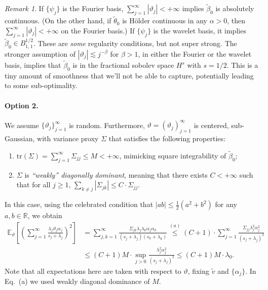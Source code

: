\documentclass[11pt,a4paper]{article}
\renewcommand{\tilde}{\widetilde}
\theoremstyle{definition}
\theoremstyle{plain}
\theoremstyle{remark}
\newtheorem{remark}{Remark}[section]
\newcommand{\tr}{\mathrm{tr}}
\begin{document}
\begin{remark}
If $\{\psi_j\}$ is the Fourier basis, $\sum_{j=1}^{\infty}|\vartheta_j|<+\infty$ implies $\tilde\beta_0$ is absolutely continuous. (On the other hand, if $\tilde\theta_0$ is H\"{o}lder continuous in any $\alpha>0$,
then $\sum_{j=1}^{\infty}|\vartheta_j|<+\infty$ on the Fourier basis.)
If $\{\psi_j\}$ is the wavelet basis, it implies $\tilde\beta_0\in B_{1,1}^{1/2}$.
These are \emph{some} regularity conditions, but not super strong. The stronger assumption of $|\vartheta_j|\lesssim j^{-\beta}$ for $\beta>1$, in either the Fourier or the wavelet basis,
implies that $\tilde\beta_0$ is in the fractional sobolev space $H^{s}$ with $s=1/2$. This is a tiny amount of smoothness that we'll not be able to capture, potentially leading to some sub-optimality.
\end{remark}

\paragraph{Option 2.} We assume $\{\vartheta_j\}_{j=1}^{\infty}$ is random. Furthermore, $\vartheta=(\vartheta_j)_{j=1}^{\infty}$ is centered, sub-Gaussian, with variance proxy $\Sigma$ that satisfies the following properties:
\begin{enumerate}
\item $\tr(\Sigma) =\sum_{j=1}^{\infty}\Sigma_{jj} \leq M<+\infty$, mimicking square integrability of $\tilde\beta_0$;
\item $\Sigma$ is \emph{``weakly'' diagonally dominant}, meaning that there exists $C<+\infty$ such that for all $j\geq 1$, $\sum_{k\neq j}|\Sigma_{jk}|\leq C\cdot \Sigma_{jj}$.
\end{enumerate}

In this case, using the celebrated condition that $|ab|\leq \frac{1}{2}(a^2+b^2)$ for any $a,b\in\mathbb R$, we obtain
\begin{align*}
\mathbb E_{\vartheta}\left[\left(\sum_{j=1}^{\infty}\frac{\lambda_j\vartheta_j\alpha_j}{s_j+\lambda_j}\right)^2\right]
&= \sum_{j,k=1}^{\infty} \frac{\Sigma_{jk}\lambda_j\lambda_k\alpha_j\alpha_k}{(s_j+\lambda_j)(s_k+\lambda_k)} 
\overset{(a)}{\leq} (C+1)\cdot \sum_{j=1}^{\infty}\frac{\Sigma_{jj}\lambda_j^2\alpha_j^2}{(s_j+\lambda_j)^2}\\
&\leq (C+1)M\cdot \sup_{j>0}\frac{\lambda_j^2\alpha_j^2}{(s_j+\lambda_j)^2} \leq (C+1)M\cdot \lambda_0.
\end{align*}
Note that all expectations here are taken with respect to $\vartheta$, fixing $\tilde v$ and $\{\alpha_j\}$.
In Eq.~(a) we used weakly diagonal dominance of $M$.
\end{document}
